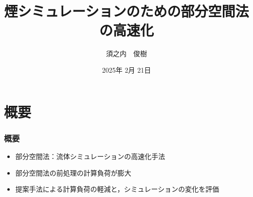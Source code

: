 \documentclass[aspectratio=169,dvipdfmx,hyperref={bookmarks=true}]{beamer}
\title{煙シミュレーションのための部分空間法の高速化}
\author{須之内　俊樹}
\institute{中央大学理工学研究科　情報工学専攻　\\形状情報処理研究室　23N8100018B}
\date{2025年 2月 21日}
\begin{document}
   \begin{frame}
 \maketitle
 \end{frame} 
     \section{概要}
 \begin{frame}
 \frametitle{概要}
  \begin{block}{}
  \begin{itemize}
	\item 部分空間法：流体シミュレーションの高速化手法
	\item 部分空間法の前処理の計算負荷が膨大
	\item 提案手法による計算負荷の軽減と，シミュレーションの変化を評価
\end{itemize}
\end{block}

 \end{frame}
\end{document}

